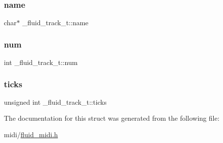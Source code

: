 \subsubsection{\texorpdfstring{name}{name}}
{\footnotesize\ttfamily char$\ast$ \+\_\+fluid\+\_\+track\+\_\+t\+::name}

\mbox{\label{struct__fluid__track__t_a5a7355b3a3a63d85fbc1f7d530c85beb}} 
\subsubsection{\texorpdfstring{num}{num}}
{\footnotesize\ttfamily int \+\_\+fluid\+\_\+track\+\_\+t\+::num}

\mbox{\label{struct__fluid__track__t_a000f5183fac347c6daafa6d04a5843d2}} 
\subsubsection{\texorpdfstring{ticks}{ticks}}
{\footnotesize\ttfamily unsigned int \+\_\+fluid\+\_\+track\+\_\+t\+::ticks}



The documentation for this struct was generated from the following file\+:\begin{DoxyCompactItemize}
\item 
midi/\hyperlink{fluid__midi_8h}{fluid\+\_\+midi.\+h}\end{DoxyCompactItemize}
